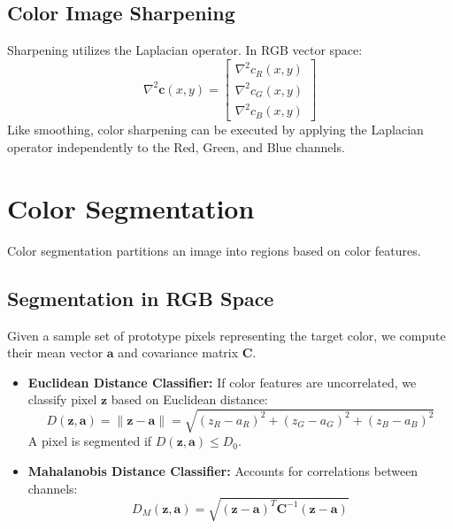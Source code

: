 \documentclass[12pt,a4paper]{article}
\begin{document}
\subsection{Color Image Sharpening}
Sharpening utilizes the Laplacian operator. In RGB vector space:
\begin{equation}
  \nabla^2 \mathbf{c}(x,y) = \begin{bmatrix}
    \nabla^2 c_R(x,y) \\
    \nabla^2 c_G(x,y) \\
    \nabla^2 c_B(x,y)
  \end{bmatrix}
\end{equation}
Like smoothing, color sharpening can be executed by applying the Laplacian operator independently to the Red, Green, and Blue channels.

\section{Color Segmentation}

Color segmentation partitions an image into regions based on color features.

\subsection{Segmentation in RGB Space}
Given a sample set of prototype pixels representing the target color, we compute their mean vector $\mathbf{a}$ and covariance matrix $\mathbf{C}$.
\begin{itemize}[leftmargin=*, itemsep=3.5pt]
  \item \textbf{Euclidean Distance Classifier:} If color features are uncorrelated, we classify pixel $\mathbf{z}$ based on Euclidean distance:
    \begin{equation}
      D(\mathbf{z}, \mathbf{a}) = \|\mathbf{z} - \mathbf{a}\| = \sqrt{(z_R - a_R)^2 + (z_G - a_G)^2 + (z_B - a_B)^2}
    \end{equation}
    A pixel is segmented if $D(\mathbf{z}, \mathbf{a}) \le D_0$.
  \item \textbf{Mahalanobis Distance Classifier:} Accounts for correlations between channels:
    \begin{equation}
      D_M(\mathbf{z}, \mathbf{a}) = \sqrt{(\mathbf{z} - \mathbf{a})^T \mathbf{C}^{-1} (\mathbf{z} - \mathbf{a})}
    \end{equation}
\end{itemize}
\end{document}
